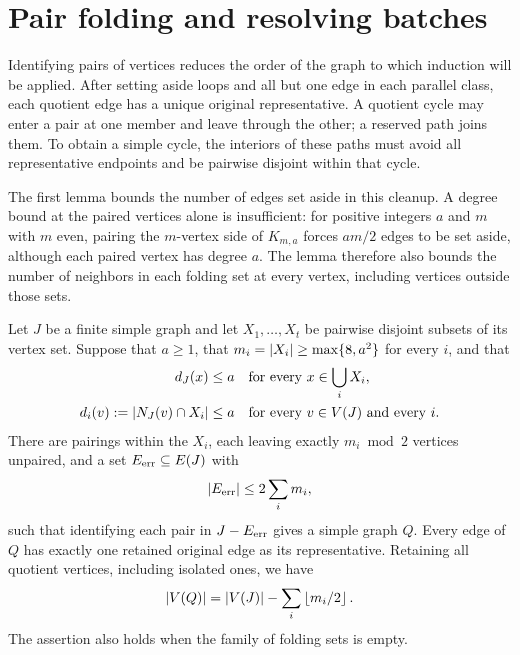 \section{Pair folding and resolving batches}
\label{sec:folding}

Identifying pairs of vertices reduces the order of the graph to which
induction will be applied. After setting aside loops and all but one edge
in each parallel class, each quotient edge has a unique original
representative. A quotient cycle may enter a pair at one member and leave
through the other; a reserved path joins them. To obtain a simple cycle,
the interiors of these paths must avoid all representative endpoints and
be pairwise disjoint within that cycle.

The first lemma bounds the number of edges set aside in this cleanup.
A degree bound at the paired vertices alone is insufficient: for positive
integers $a$ and $m$ with $m$ even, pairing the $m$-vertex side of
$K_{m,a}$ forces $am/2$ edges to be set aside, although each paired vertex
has degree $a$. The lemma therefore also bounds the number of neighbors
in each folding set at every vertex, including vertices outside those sets.

\begin{lemma}\label{lem:pair-folding}
Let $J$ be a finite simple graph and let $X_1,\ldots,X_t$ be pairwise
disjoint subsets of its vertex set.  Suppose that $a\ge1$, that
$m_i=\left|X_i\right|\ge\max\{8,a^2\}$ for every $i$, and that
\begin{align}
 d_J(x)&\le a &&\text{for every }x\in\bigcup_i X_i,\label{eq:fold-degree}\\
 d_i(v):=\left|N_J(v)\cap X_i\right|&\le a
     &&\text{for every }v\in V(J)\text{ and every }i.
     \label{eq:fold-neighbors}
\end{align}
There are pairings within the $X_i$, each leaving exactly $m_i\bmod2$
vertices unpaired, and a set $E_{\rm err}\subseteq E(J)$ with
\[
 \left|E_{\rm err}\right|\le 2\sum_i m_i,
\]
such that identifying each pair in $J-E_{\rm err}$ gives a simple graph
$Q$.  Every edge of $Q$ has exactly one retained original edge as its
representative.  Retaining all quotient vertices, including isolated ones,
we have
\begin{equation}\label{eq:fold-order}
 \left|V(Q)\right|=\left|V(J)\right|-\sum_i\left\lfloor m_i/2\right\rfloor.
\end{equation}
The assertion also holds when the family of folding sets is empty.
\end{lemma}

